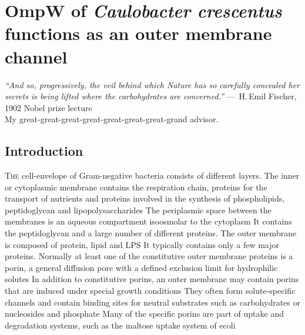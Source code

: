 \acresetall

\chapter{OmpW of \textit{Caulobacter crescentus} functions as an outer membrane channel}
\label{ch:porin}
\begin{epigraph}
  \emph{``And so, progressively, the veil behind which Nature has so carefully concealed her secrets is being lifted where the carbohydrates are concerned.''} ---~H.\,Emil Fischer, 1902 Nobel prize lecture\\ My great-great-great-great-great-great-great-grand advisor.
\end{epigraph}
\section{Introduction} %
\label{sec:porin_introduction} 
\lettrine[lines=2]{T}{he} cell-envelope of Gram-negative bacteria consists of different layers. The inner or cytoplasmic membrane contains the respiration chain, proteins for the transport of nutrients and proteins involved in the synthesis of phospholipids, peptidoglycan and lipopolysaccharides The periplasmic space between the membranes is an aqueous compartment isoosmolar to the cytoplasm It contains the peptidoglycan and a large number of different proteins. The outer membrane is composed of protein, lipid and \ac{LPS} It typically contains only a few major proteins. Normally at least one of the constitutive outer membrane proteins is a porin, a general diffusion pore with a defined exclusion limit for hydrophilic solutes In addition to constitutive porins, an outer membrane may contain porins that are induced under special growth conditions They often form solute-specific channels and contain binding sites for neutral substrates such as carbohydrates or nucleosides and phosphate Many of the specific porins are part of uptake and degradation systems, such as the maltose uptake system of \ac{ecoli} 

